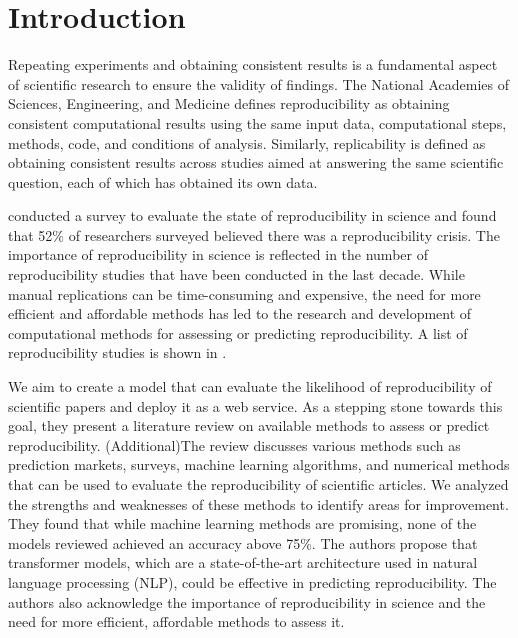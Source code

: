 \documentclass[12pt, a4paper, twocolumn]{article}
\begin{document}
		

	\section{Introduction}

	Repeating experiments and obtaining consistent results is a fundamental aspect of scientific research to ensure the validity of findings. The National Academies of Sciences, Engineering, and Medicine defines reproducibility as obtaining consistent computational results using the same input data, computational steps, methods, code, and conditions of analysis. Similarly, replicability is defined as obtaining consistent results across studies aimed at answering the same scientific question, each of which has obtained its own data.

	 \citet{baker2016reproducibility} conducted a survey to evaluate the state of reproducibility in science and found that 52\% of researchers surveyed believed there was a reproducibility crisis. The importance of reproducibility in science is reflected in the number of reproducibility studies that have been conducted in the last decade. While manual replications can be time-consuming and expensive, the need for more efficient and affordable methods has led to the research and development of computational methods for assessing or predicting reproducibility. A list of reproducibility studies is shown in .
  
	We aim to create a model that can evaluate the likelihood of reproducibility of scientific papers and deploy it as a web service. As a stepping stone towards this goal, they present a literature review on available methods to assess or predict reproducibility. 
	(Additional)The review discusses various methods such as prediction markets, surveys, machine learning algorithms, and numerical methods that can be used to evaluate the reproducibility of scientific articles. We analyzed the strengths and weaknesses of these methods to identify areas for improvement. They found that while machine learning methods are promising, none of the models reviewed achieved an accuracy above 75\%. The authors propose that transformer models, which are a state-of-the-art architecture used in natural language processing (NLP), could be effective in predicting reproducibility. The authors also acknowledge the importance of reproducibility in science and the need for more efficient, affordable methods to assess it.
\end{document}
